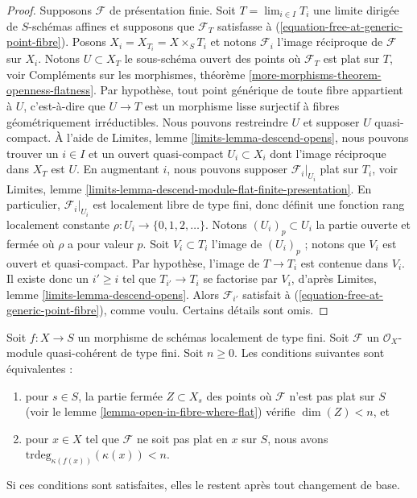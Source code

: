 \begin{proof}
\medskip\noindent
Supposons $\mathcal{F}$ de présentation finie.
Soit $T = \lim_{i \in I} T_i$ une limite dirigée de $S$-schémas affines
et supposons que $\mathcal{F}_T$ satisfasse à
(\ref{equation-free-at-generic-point-fibre}).
Posons $X_i = X_{T_i} = X \times_S T_i$ et notons $\mathcal{F}_i$
l'image réciproque de $\mathcal{F}$ sur $X_i$.
Notons $U \subset X_T$ le sous-schéma ouvert des points où
$\mathcal{F}_T$ est plat sur $T$, voir
Compléments sur les morphismes, théorème \ref{more-morphisms-theorem-openness-flatness}.
Par hypothèse, tout point générique de toute fibre appartient à $U$, c'est-à-dire que
$U \to T$ est un morphisme lisse surjectif à fibres géométriquement irréductibles.
Nous pouvons restreindre $U$ et supposer $U$ quasi-compact.
À l'aide de
Limites, lemme \ref{limits-lemma-descend-opens},
nous pouvons trouver un $i \in I$ et un ouvert quasi-compact $U_i \subset X_i$
dont l'image réciproque dans $X_T$ est $U$. En augmentant $i$, nous pouvons
supposer $\mathcal{F}_i|_{U_i}$ plat sur $T_i$, voir
Limites, lemme \ref{limits-lemma-descend-module-flat-finite-presentation}.
En particulier, $\mathcal{F}_i|_{U_i}$ est localement libre de type fini,
donc définit une fonction rang
localement constante $\rho : U_i \to \{0, 1, 2, \ldots \}$.
Notons $(U_i)_p \subset U_i$ la partie ouverte et fermée
où $\rho$ a pour valeur $p$. Soit $V_i \subset T_i$
l'image de $(U_i)_p$ ; notons que $V_i$ est ouvert et quasi-compact.
Par hypothèse, l'image de $T \to T_i$ est contenue dans $V_i$.
Il existe donc un $i' \geq i$ tel que $T_{i'} \to T_i$ se factorise
par $V_i$, d'après
Limites, lemme \ref{limits-lemma-descend-opens}.
Alors $\mathcal{F}_{i'}$ satisfait à (\ref{equation-free-at-generic-point-fibre}),
comme voulu. Certains détails sont omis.
\end{proof}

\begin{lemma}
\label{lemma-pre-flat-dimension-n}
Soit $f : X \to S$ un morphisme de schémas localement de type fini.
Soit $\mathcal{F}$ un $\mathcal{O}_X$-module quasi-cohérent de type
fini. Soit $n \geq 0$. Les conditions suivantes sont équivalentes :
\begin{enumerate}
\item pour $s \in S$, la partie fermée $Z \subset X_s$ des points
où $\mathcal{F}$ n'est pas plat sur $S$ (voir le
lemme \ref{lemma-open-in-fibre-where-flat})
vérifie $\dim(Z) < n$, et
\item pour $x \in X$ tel que $\mathcal{F}$ ne soit pas plat en $x$
sur $S$, nous avons\newline $\text{trdeg}_{\kappa(f(x))}(\kappa(x)) < n$.
\end{enumerate}
Si ces conditions sont satisfaites, elles le restent après tout changement de base.
\end{lemma}

